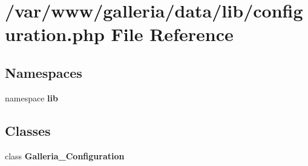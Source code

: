 \section{/var/www/galleria/data/lib/configuration.php File Reference}
\label{configuration_8php}
\subsection*{Namespaces}
\begin{CompactItemize}
\item 
namespace {\bf lib}
\end{CompactItemize}
\subsection*{Classes}
\begin{CompactItemize}
\item 
class {\bf Galleria\_\-Configuration}
\end{CompactItemize}
